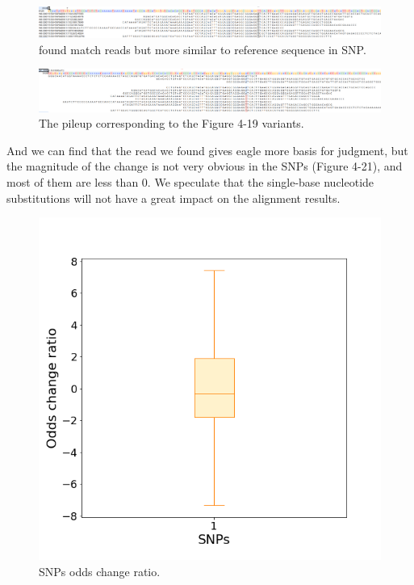 \begin{figure}[H]
    \centering
    \includegraphics[width=1\columnwidth]{body/image/4-19.png}
    \captionsetup{labelfont=bf}
    \renewcommand{\baselinestretch}{1.0}
    \vspace{-1cm}
    \caption[SNP worse match reads]{ found match reads but more similar to reference sequence in SNP.}
    \label{f4-19}
\end{figure}

\vspace{0.5cm}
\begin{figure}[H]
    \centering
    \includegraphics[width=1\columnwidth]{body/image/4-20.png}
    \captionsetup{labelfont=bf}
    \renewcommand{\baselinestretch}{1.0}
    \vspace{-1cm}
    \caption[Figure 4.19 pileup]{The pileup corresponding to the Figure 4-19 variants.}
    \label{f4-20}
\end{figure}

And we can find that the read we found gives eagle more basis for judgment, but the magnitude of the change is not very obvious in the SNPs (Figure 4-21), and most of them are less than 0. We speculate that the single-base nucleotide substitutions will not have a great impact on the alignment results.

\vspace{1cm}
\begin{figure}[H]
    \centering
    \includegraphics[width=0.6\columnwidth]{body/image/4-21.png}
    \captionsetup{labelfont=bf}
    \renewcommand{\baselinestretch}{1.0}
    \caption[SNPs odds change ratio]{SNPs odds change ratio.}
    \label{f4-21}
\end{figure}

